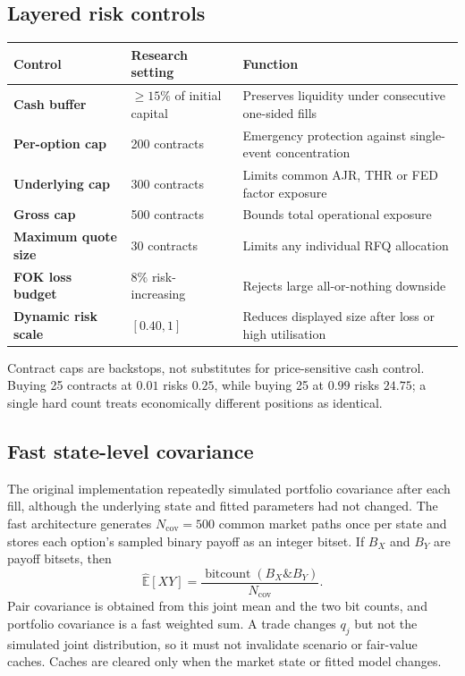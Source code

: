 \documentclass[10pt,a4paper]{article}
\newcommand{\E}{\mathbb{E}}
\newcommand{\1}{\mathbf{1}}
\begin{document}
\subsection{Layered risk controls}
\begin{table}[h]
\centering\small
\begin{tabularx}{\textwidth}{>{\raggedright\arraybackslash\bfseries}p{3.0cm}p{2.6cm}X}
\toprule
Control & Research setting & Function \\
\midrule
Cash buffer & $\ge15\%$ of initial capital & Preserves liquidity under consecutive one-sided fills \\
Per-option cap & 200 contracts & Emergency protection against single-event concentration \\
Underlying cap & 300 contracts & Limits common AJR, THR or FED factor exposure \\
Gross cap & 500 contracts & Bounds total operational exposure \\
Maximum quote size & 30 contracts & Limits any individual RFQ allocation \\
FOK loss budget & $8\%$ risk-increasing & Rejects large all-or-nothing downside \\
Dynamic risk scale & $[0.40,1]$ & Reduces displayed size after loss or high utilisation \\
\bottomrule
\end{tabularx}
\end{table}

Contract caps are backstops, not substitutes for price-sensitive cash control.  Buying
25 contracts at $0.01$ risks $0.25$, while buying 25 at $0.99$ risks $24.75$; a single
hard count treats economically different positions as identical.

\subsection{Fast state-level covariance}
The original implementation repeatedly simulated portfolio covariance after each
fill, although the underlying state and fitted parameters had not changed.  The fast
architecture generates $N_{\mathrm{cov}}=500$ common market paths once per state and
stores each option's sampled binary payoff as an integer bitset.  If $B_X$ and $B_Y$
are payoff bitsets, then
\[
 \widehat{\E}[XY]=\frac{\operatorname{bitcount}(B_X\mathbin{\&}B_Y)}{N_{\mathrm{cov}}}.
\]
Pair covariance is obtained from this joint mean and the two bit counts, and portfolio
covariance is a fast weighted sum.  A trade changes $q_j$ but not the simulated joint
distribution, so it must not invalidate scenario or fair-value caches.  Caches are
cleared only when the market state or fitted model changes.
\end{document}
